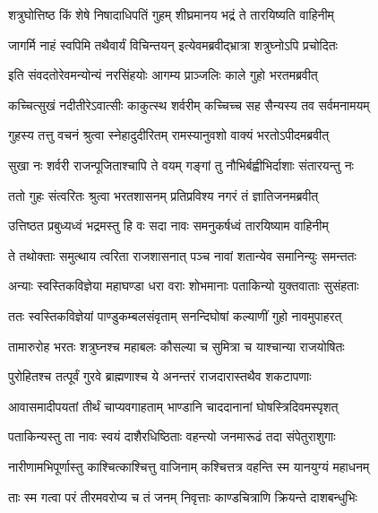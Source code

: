 \twolineshloka
{शत्रुघोत्तिष्ठ किं शेषे निषादाधिपतिं गुहम्}
{शीघ्रमानय भद्रं ते तारयिष्यति वाहिनीम्} %

\twolineshloka
{जागर्मि नाहं स्वपिमि तथैवार्यं विचिन्तयन्}
{इत्येवमब्रवीद्भ्रात्रा शत्रुघ्नोऽपि प्रचोदितः} %

\twolineshloka
{इति संवदतोरेवमन्योन्यं नरसिंहयोः}
{आगम्य प्राञ्जलिः काले गुहो भरतमब्रवीत्} %

\twolineshloka
{कच्चित्सुखं नदीतीरेऽवात्सीः काकुत्स्थ शर्वरीम्}
{कच्चिच्च सह सैन्यस्य तव सर्वमनामयम्} %

\twolineshloka
{गुहस्य तत्तु वचनं श्रुत्वा स्नेहादुदीरितम्}
{रामस्यानुवशो वाक्यं भरतोऽपीदमब्रवीत्} %

\twolineshloka
{सुखा नः शर्वरी राजन्पूजिताश्चापि ते वयम्}
{गङ्गां तु नौभिर्बह्वीभिर्दाशाः संतारयन्तु नः} %

\twolineshloka
{ततो गुहः संत्वरितः श्रुत्वा भरतशासनम्}
{प्रतिप्रविश्य नगरं तं ज्ञातिजनमब्रवीत्} %

\twolineshloka
{उत्तिष्ठत प्रबुध्यध्वं भद्रमस्तु हि वः सदा}
{नावः समनुकर्षध्वं तारयिष्याम वाहिनीम्} %

\twolineshloka
{ते तथोक्ताः समुत्थाय त्वरिता राजशासनात्}
{पञ्च नावां शतान्येव समानिन्युः समन्ततः} %

\twolineshloka
{अन्याः स्वस्तिकविज्ञेया महाघण्डा धरा वराः}
{शोभमानाः पताकिन्यो युक्तवाताः सुसंहताः} %

\twolineshloka
{ततः स्वस्तिकविज्ञेयां पाण्डुकम्बलसंवृताम्}
{सनन्दिघोषां कल्याणीं गुहो नावमुपाहरत्} %

\twolineshloka
{तामारुरोह भरतः शत्रुघ्नश्च महाबलः}
{कौसल्या च सुमित्रा च याश्चान्या राजयोषितः} %

\twolineshloka
{पुरोहितश्च तत्पूर्वं गुरवे ब्राह्मणाश्च ये}
{अनन्तरं राजदारास्तथैव शकटापणाः} %

\twolineshloka
{आवासमादीपयतां तीर्थं चाप्यवगाहताम्}
{भाण्डानि चाददानानां घोषस्त्रिदिवमस्पृशत्} %

\twolineshloka
{पताकिन्यस्तु ता नावः स्वयं दाशैरधिष्ठिताः}
{वहन्त्यो जनमारूढं तदा संपेतुराशुगाः} %

\twolineshloka
{नारीणामभिपूर्णास्तु काश्चित्काश्चित्तु वाजिनाम्}
{कश्चित्तत्र वहन्ति स्म यानयुग्यं महाधनम्} %

\twolineshloka
{ताः स्म गत्वा परं तीरमवरोप्य च तं जनम्}
{निवृत्ताः काण्डचित्राणि क्रियन्ते दाशबन्धुभिः} %


